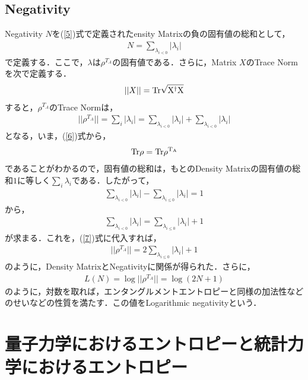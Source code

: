 \subsection{Negativity}
Negativity $N$を(\ref{5})式で定義されたensity Matrixの負の固有値の総和として，
\begin{eqnarray}
N=\sum_{\lambda_{i<0}}|\lambda_i|
\end{eqnarray}
で定義する．ここで，$\lambda$は$\rho^{T_{A}}$の固有値である．さらに，Matrix $X$のTrace Normを次で定義する．
\begin{eqnarray}
||X||=\rm{Tr}\sqrt{X^{\dagger}X}
\end{eqnarray}
すると，$\rho^{T_{A}}$のTrace Normは，
\begin{eqnarray}
\label{7}
||\rho^{T_{A}}||=\sum_{i}|\lambda_{i}|=\sum_{\lambda_{i<0}}|\lambda_i|+\sum_{\lambda_{i<0}}|\lambda_i|
\end{eqnarray}
となる，いま，(\ref{6})式から，
\begin{eqnarray}
\rm{Tr}\rho=\rm{Tr}\rho^{T_{A}}
\end{eqnarray}
であることがわかるので，固有値の総和は，もとのDensity Matrixの固有値の総和$1$に等しく$\sum_{i}\lambda_i$である．したがって，
\begin{eqnarray}
\sum_{\lambda_{i<0}}|\lambda_i|-\sum_{\lambda_{i\leqslant0}}|\lambda_i|=1
\end{eqnarray}
から，
\begin{eqnarray}
 \sum_{\lambda_{i<0}}|\lambda_i|=\sum_{\lambda_{i\leqslant0}}|\lambda_i|+1
\end{eqnarray}
が求まる．これを，(\ref{7})式に代入すれば，
\begin{eqnarray}
||\rho^{T_{A}}||=2\sum_{\lambda_{i\leqslant0}}|\lambda_i|+1
\end{eqnarray}
のように，Density MatrixとNegativityに関係が得られた．さらに，
\begin{eqnarray}
L(N)=\log||\rho^{T_{A}}||=\log(2N+1)
\end{eqnarray}
のように，対数を取れば，エンタングルメントエントロピーと同様の加法性などのせいなどの性質を満たす．この値をLogarithmic negativityという．
\section{量子力学におけるエントロピーと統計力学におけるエントロピー}
